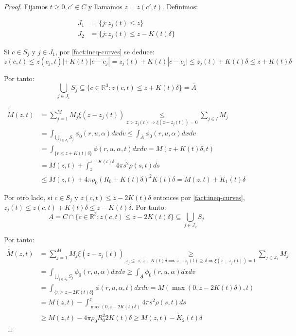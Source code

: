 \documentclass[a4paper,10pt]{scrartcl}
\theoremstyle{definition}
\newcommand{\ktilde}{\widetilde{K}}
\newcommand{\dtilde}[1]{\widetilde{\widetilde{#1}}}
\numberwithin{equation}{section}
\begin{document}
\begin{proof}
 Fijamos $t \ge 0, c'\in C$ y llamamos $z = z(c',t)$. Definimos:
 
 \begin{align*}
 J_1 &= \{j: z_j(t) \le z\}\\
 J_2 &= \{j: z_j(t) \le z - K(t)\delta\}
 \end{align*}
 
 Si $c\in S_j$ y $j\in J_1$, por \cref{fact:ineq-curves} se deduce:
 \[
    z(c,t) \le z(c_j,t)| + K(t)|c - c_j| = z_j(t) + K(t) |c - c_j| \le z_j(t) + K(t)\delta \le z + K(t) \delta
 \]
 
 Por tanto:
 \[
    \bigcup_{j\in J_1} S_j \subseteq \{c \in \mathbb{R}^3: z(c,t) \le z + K(t) \delta\} = \overline{A}
 \]
 
 
 \begin{align*}
 \dtilde{M}(z,t) &= \sum_{j = 1}^M M_j \xi(z - z_j(t)) \underset{z >       
 z_j(t) \Rightarrow \xi(z - z_j(t)) = 0}{\le} \sum_{j \in I} M_j\\
  &= \int_{\bigcup_{j\in J_1} S_j} \phi_0(r,u,\alpha) dx dv \le \int_{\overline{A}} \phi_0(r,u,\alpha) dx dv\\
  &= \int_{\{r \le z + K(t)\delta\}} \phi(r,u,\alpha,t) dx dv = M(z + K(t)\delta, t)\\
  & = M(z,t) + \int_{z}^{z+K(t)\delta} 4\pi s^2 \rho(s,t) ds \\ 
  &\le M(z,t) + 4\pi \rho_0 (R_0 + K(t) \delta)^2 K(t) \delta = M(z, t) + \ktilde_1(t) \delta
 \end{align*}

 Por otro lado, si $c \in S_j$ y $z(c,t) \le z - 2K(t) \delta$ entonces por \cref{fact:ineq-curves}, $z_j(t) \le z(c,t) + K(t) \delta \le z - K(t) \delta$. Por tanto:
 \[
  \underline{A} = C \cap \{c\in \mathbb{R}^3:z(c,t) \le z - 2K(t) \delta\} \subseteq \bigcup_{j\in J_2} S_j
 \]
 
 Por tanto:
 \begin{align*}
 \dtilde{M}(z,t) &= \sum_{j = 1}^M M_j \xi(z - z_j(t)) \underset{z_j \le < z - K(t)\delta \implies z - z_j(t) \ge \delta \Rightarrow \xi(z - z_j(t)) = 1}{\ge} \sum_{j \in J_2} M_j\\
  &= \int_{\bigcup_{j\in J_2} S_j} \phi_0(r,u,\alpha) dx dv \ge \int_{\underline{A}} \phi_0(r,u,\alpha) dx dv\\
  &= \int_{\{r \ge z - 2K(t)\delta\}} \phi(r,u,\alpha,t) dx dv = M(\max(0,z-2K(t)\delta), t)\\
  & = M(z,t) - \int_{\max(0,z-2K(t)\delta)}^z 4\pi s^2 \rho(s,t) ds \\ 
  &\ge M(z,t) - 4\pi \rho_0 R_0^2 2K(t)\delta \ge M(z, t) - \ktilde_2(t) \delta
 \end{align*}
 

\end{proof}
\end{document}
